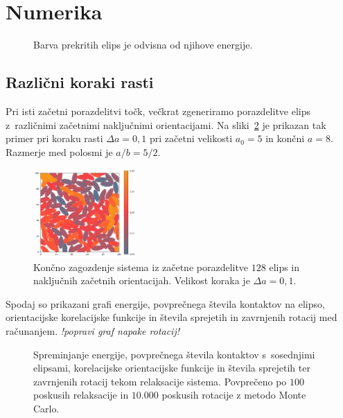 \section{Numerika}
\begin{figure}[!ht]
    \centering
    \resizebox{.6\textwidth}{!}{}
    \caption{Barva prekritih elips je odvisna od njihove energije.}
    \label{fig:energija}
\end{figure}
\subsection{Različni koraki rasti}
Pri isti začetni porazdelitvi točk, večkrat zgeneriramo porazdelitve elips z~različnimi
začetnimi naključnimi orientacijami. Na sliki~\ref{fig:delta_a_01} je prikazan tak primer
pri koraku rasti $\Delta a = 0,1$ pri začetni velikosti $a_0 = 5$ in končni $a = 8$. 
Razmerje med polosmi je $a/b = 5/2$.
\begin{figure}[!ht]
    \centering
    \includegraphics[width=0.35\textwidth]{./figures/runs/delta_a_01/run01}
    \caption{Končno zagozdenje sistema iz začetne porazdelitve $128$ elips in 
    naključnih začetnih orientacijah. Velikost koraka je $\Delta a = 0,1$.}
    \label{fig:delta_a_01}
\end{figure}
Spodaj so prikazani grafi energije, povprečnega števila kontaktov na elipso, orientacijske
korelacijske funkcije in števila sprejetih in zavrnjenih rotacij med računanjem. 
\emph{!popravi graf napake rotacij!}
\begin{figure}
    \centering
    \resizebox{.48\textwidth}{!}{}
    \resizebox{.48\textwidth}{!}{}
    \resizebox{.48\textwidth}{!}{}
    \resizebox{.48\textwidth}{!}{}
    \resizebox{.48\textwidth}{!}{}
    \resizebox{.48\textwidth}{!}{}
    \resizebox{.48\textwidth}{!}{}
    \resizebox{.48\textwidth}{!}{}
    \caption{Spreminjanje energije, povprečnega števila kontaktov s~sosednjimi elipsami,
    korelacijske orientacijske funkcije in števila sprejetih ter zavrnjenih rotacij tekom
    relaksacije sistema. Povprečeno po $100$ poskusih relaksacije in $10.000$ poskusih 
    rotacije z metodo Monte Carlo.}
    \label{fig:average_a_01}
\end{figure}
